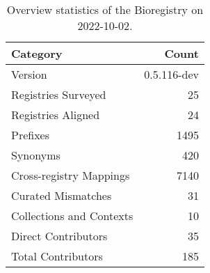 \begin{table}
\centering
\caption{Overview statistics of the Bioregistry on 2022-10-02.}
\label{tab:bioregistry-summary}
\begin{tabular}{lr}
\toprule
                Category &       Count \\
\midrule
                 Version & 0.5.116-dev \\
     Registries Surveyed &          25 \\
      Registries Aligned &          24 \\
                Prefixes &        1495 \\
                Synonyms &         420 \\
 Cross-registry Mappings &        7140 \\
      Curated Mismatches &          31 \\
Collections and Contexts &          10 \\
     Direct Contributors &          35 \\
      Total Contributors &         185 \\
\bottomrule
\end{tabular}
\end{table}
